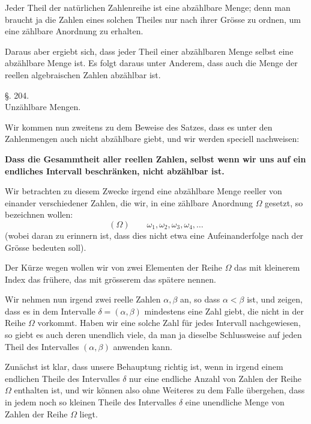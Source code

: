\documentclass[11pt]{article}
\begin{document}
Jeder Theil der natürlichen Zahlenreihe ist eine abzählbare Menge; denn man braucht ja die Zahlen eines solchen Theiles nur nach ihrer Grösse zu ordnen, um eine zählbare Anordnung zu erhalten.

Daraus aber ergiebt sich, dass jeder Theil einer abzählbaren Menge selbst eine abzählbare Menge ist. Es folgt daraus unter Anderem, dass auch die Menge der reellen algebraischen Zahlen abzählbar ist.

\begin{center}
{\large §. 204.}\\[0.4em]
{\large Unzählbare Mengen.}
\end{center}

Wir kommen nun zweitens zu dem Beweise des Satzes, dass es unter den Zahlenmengen auch nicht abzählbare giebt, und wir werden speciell nachweisen:

\begin{center}
\textbf{Dass die Gesammtheit aller reellen Zahlen, selbst wenn wir uns auf ein endliches Intervall beschränken, nicht abzählbar ist.}
\end{center}

Wir betrachten zu diesem Zwecke irgend eine abzählbare Menge reeller von einander verschiedener Zahlen, die wir, in eine zählbare Anordnung $\Omega$ gesetzt, so bezeichnen wollen:
\[
(\Omega)\qquad \omega_1,\omega_2,\omega_3,\omega_4,\ldots
\]
(wobei daran zu erinnern ist, dass dies nicht etwa eine Aufeinanderfolge nach der Grösse bedeuten soll).

Der Kürze wegen wollen wir von zwei Elementen der Reihe $\Omega$ das mit kleinerem Index das frühere, das mit grösserem das spätere nennen.

Wir nehmen nun irgend zwei reelle Zahlen $\alpha,\beta$ an, so dass $\alpha<\beta$ ist, und zeigen, dass es in dem Intervalle $\delta=(\alpha,\beta)$ mindestens eine Zahl giebt, die nicht in der Reihe $\Omega$ vorkommt. Haben wir eine solche Zahl für jedes Intervall nachgewiesen, so giebt es auch deren unendlich viele, da man ja dieselbe Schlussweise auf jeden Theil des Intervalles $(\alpha,\beta)$ anwenden kann.

Zunächst ist klar, dass unsere Behauptung richtig ist, wenn in irgend einem endlichen Theile des Intervalles $\delta$ nur eine endliche Anzahl von Zahlen der Reihe $\Omega$ enthalten ist, und wir können also ohne Weiteres zu dem Falle übergehen, dass in jedem noch so kleinen Theile des Intervalles $\delta$ eine unendliche Menge von Zahlen der Reihe $\Omega$ liegt.
\end{document}
